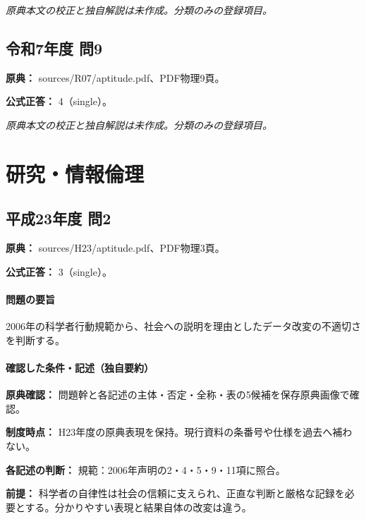 \par\textit{原典本文の校正と独自解説は未作成。分類のみの登録項目。}

\subsection{令和7年度 問9}
\label{q:r07-reg-apt-09}

\noindent\textbf{原典：} sources/R07/aptitude.pdf、PDF物理9頁。

\textbf{公式正答：} 4（single）。

\par\textit{原典本文の校正と独自解説は未作成。分類のみの登録項目。}

\section{研究・情報倫理}

\subsection{平成23年度 問2}
\label{q:h23-reg-apt-02}

\noindent\textbf{原典：} sources/H23/aptitude.pdf、PDF物理3頁。

\textbf{公式正答：} 3（single）。

\paragraph{問題の要旨} 2006年の科学者行動規範から、社会への説明を理由としたデータ改変の不適切さを判断する。

\paragraph{確認した条件・記述（独自要約）}\mbox{}\par

\noindent\textbf{原典確認：} 問題幹と各記述の主体・否定・全称・表の5候補を保存原典画像で確認。\par

\noindent\textbf{制度時点：} H23年度の原典表現を保持。現行資料の条番号や仕様を過去へ補わない。\par

\noindent\textbf{各記述の判断：} 規範：2006年声明の2・4・5・9・11項に照合。\par

\noindent\textbf{前提：} 科学者の自律性は社会の信頼に支えられ、正直な判断と厳格な記録を必要とする。分かりやすい表現と結果自体の改変は違う。\par

